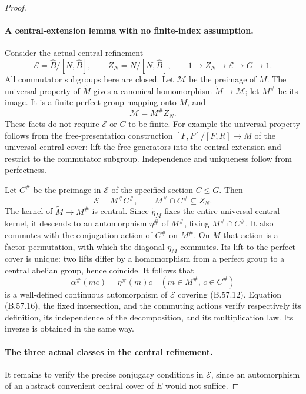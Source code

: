 \begin{proof}
\paragraph{A central-extension lemma with no finite-index assumption.}
Consider the actual central refinement
\[
 \mathscr E=\widehat B/[N,\widehat B],\qquad
 Z_N=N/[N,\widehat B],\qquad
                   1\to Z_N\to\mathscr E\to G\to1.
                                                               \tag{B.57.15}
\]
All commutator subgroups here are closed.
Let $\mathscr M$ be the preimage of $M$.
The universal property of $\widetilde M$ gives a
canonical homomorphism $\widetilde M\to\mathscr M$;
let $M^\#$ be its image. It is a finite perfect group
mapping onto $M$, and
\[
                   \mathscr M=M^\# Z_N.
\]
These facts do not require $\mathscr E$ or $C$ to
be finite. For example the universal property follows
from the free-presentation construction
$[F,F]/[F,R]\to M$ of the universal central cover:
lift the free generators into the central extension
and restrict to the commutator subgroup. Independence
and uniqueness follow from perfectness.

Let $C^\#$ be the preimage in $\mathscr E$ of the
specified section $C\leq G$. Then
\[
       \mathscr E=M^\# C^\#,\qquad
       M^\#\cap C^\#\subseteq Z_N.                         \tag{B.57.16}
\]
The kernel of $\widetilde M\to M^\#$ is central.
Since $\widetilde\eta_M$ fixes the entire universal
central kernel, it descends to an automorphism
$\eta^\#$ of $M^\#$, fixing $M^\#\cap C^\#$.
It also commutes with the conjugation action of
$C^\#$ on $M^\#$. On $M$ that action is a factor
permutation, with which the diagonal $\eta_M$
commutes. Its lift to the perfect cover is unique:
two lifts differ by a homomorphism from a perfect
group to a central abelian group, hence coincide.
It follows that
\[
              \alpha^\#(mc)=\eta^\#(m)c
                    \quad(m\in M^\#,\,c\in C^\#)           \tag{B.57.17}
\]
is a well-defined continuous automorphism of
$\mathscr E$ covering (B.57.12). Equation (B.57.16),
the fixed intersection, and the commuting actions
verify respectively its definition, its independence
of the decomposition, and its multiplication law.
Its inverse is obtained in the same way.

\paragraph{The three actual classes in the central refinement.}
It remains to verify the precise conjugacy conditions
in $\mathscr E$, since an automorphism of an abstract
convenient central cover of $E$ would not suffice.


\end{proof}
